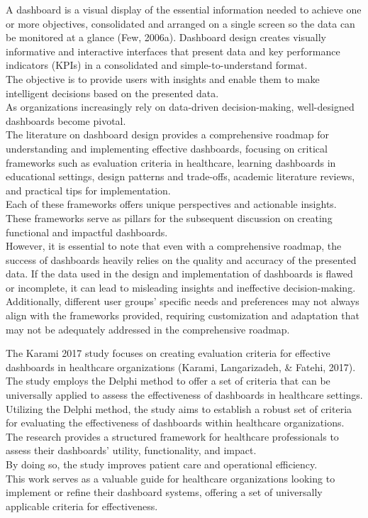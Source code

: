 \documentclass[print]{nuthesis}
\begin{document}
A dashboard is a visual display of the essential information needed to achieve one or more objectives, consolidated and arranged on a single screen so the data can be monitored at a glance (Few, 2006a).
Dashboard design creates visually informative and interactive interfaces that present data and key performance indicators (KPIs) in a consolidated and simple-to-understand format.\\
The objective is to provide users with insights and enable them to make intelligent decisions based on the presented data.\\
As organizations increasingly rely on data-driven decision-making, well-designed dashboards become pivotal.\\
The literature on dashboard design provides a comprehensive roadmap for understanding and implementing effective dashboards, focusing on critical frameworks such as evaluation criteria in healthcare, learning dashboards in educational settings, design patterns and trade-offs, academic literature reviews, and practical tips for implementation.\\
Each of these frameworks offers unique perspectives and actionable insights.
These frameworks serve as pillars for the subsequent discussion on creating functional and impactful dashboards.\\
However, it is essential to note that even with a comprehensive roadmap, the success of dashboards heavily relies on the quality and accuracy of the presented data.
If the data used in the design and implementation of dashboards is flawed or incomplete, it can lead to misleading insights and ineffective decision-making.
Additionally, different user groups' specific needs and preferences may not always align with the frameworks provided, requiring customization and adaptation that may not be adequately addressed in the comprehensive roadmap.

The Karami 2017 study focuses on creating evaluation criteria for effective dashboards in healthcare organizations (Karami, Langarizadeh, \& Fatehi, 2017).\\
The study employs the Delphi method to offer a set of criteria that can be universally applied to assess the effectiveness of dashboards in healthcare settings.
Utilizing the Delphi method, the study aims to establish a robust set of criteria for evaluating the effectiveness of dashboards within healthcare organizations.\\
The research provides a structured framework for healthcare professionals to assess their dashboards' utility, functionality, and impact.\\
By doing so, the study improves patient care and operational efficiency.\\
This work serves as a valuable guide for healthcare organizations looking to implement or refine their dashboard systems, offering a set of universally applicable criteria for effectiveness.
\end{document}
